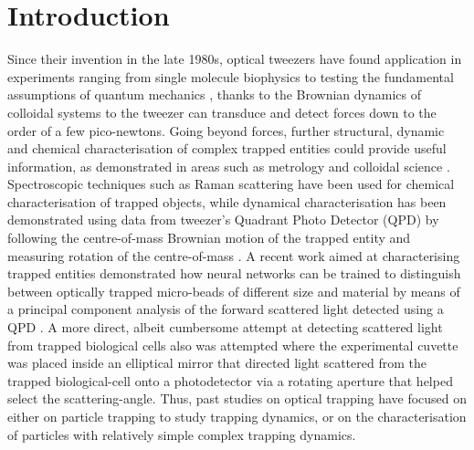 \documentclass[12pt]{spieman}
\begin{document}
\section{Introduction}
\begin{spacing}{1.5}

\label{sec:Intro}
Since their invention in the late 1980s, optical tweezers have found application in experiments ranging from single molecule biophysics \cite{Bustamante2021Biophysics} to testing the fundamental assumptions of quantum mechanics \cite{yin2013large}, thanks to the Brownian dynamics of colloidal systems to the tweezer can transduce and detect forces down to the order of a few pico-newtons. Going beyond forces, further structural, dynamic and chemical characterisation of complex trapped entities could provide useful information, as demonstrated in areas such as metrology \cite{arita2020coherent} and colloidal science \cite{burns1990optical}. Spectroscopic techniques such as Raman scattering \cite{gupta2014raman} have been used for chemical characterisation of trapped objects, while dynamical characterisation has been demonstrated using data from tweezer's Quadrant Photo Detector (QPD) by following the centre-of-mass Brownian motion of the trapped entity \cite{friedrich2012tuning} and measuring rotation of the centre-of-mass \cite{yifat2021facile}. A recent work aimed at characterising trapped entities demonstrated how neural networks can be trained to distinguish between optically trapped micro-beads of different size and material by means of a principal component analysis of the forward scattered light detected using a QPD \cite{Carvalho_2023}. A more direct, albeit cumbersome attempt at detecting scattered light from trapped biological cells also was attempted \cite{Watson_2023} where the experimental cuvette was placed inside an elliptical mirror that directed light scattered from the trapped biological-cell onto a photodetector via a rotating aperture that helped select the scattering-angle. Thus, past studies on optical trapping have focused on either on particle trapping to study trapping dynamics, or on the characterisation of particles with relatively simple complex trapping dynamics. 


\end{spacing}
\end{document}
